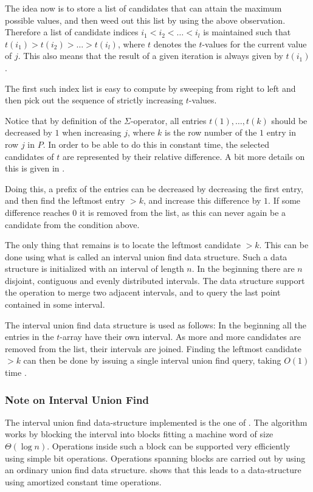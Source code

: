 \documentclass[twoside,11pt,openright]{report}
\begin{document}
The idea now is to store a list of candidates that can attain the maximum possible values, and then weed out this list by using the above observation. Therefore a list of candidate indices $i_1 < i_2 < \dots < i_l$ is maintained such that $t(i_1) > t(i_2) > \dots > t(i_l)$, where $t$ denotes the $t$-values for the current value of $j$. This also means that the result of a given iteration is always given by $t(i_1)$.

The first such index list is easy to compute by sweeping from right to left and then pick out the sequence of strictly increasing $t$-values.

Notice that by definition of the $\Sigma$-operator, all entries $t(1), \dots, t(k)$ should be decreased by $1$ when increasing $j$, where $k$ is the row number of the $1$ entry in row $j$ in $P$. In order to be able to do this in constant time, the selected candidates of $t$ are represented by their relative difference. A bit more details on this is given in \cite[Lemma 2, p. 234]{Gawrychowski:2012:FAC:2422024.2422048}.

Doing this, a prefix of the entries can be decreased by decreasing the first entry, and then find the leftmost entry $> k$, and increase this difference by $1$. If some difference reaches $0$ it is removed from the list, as this can never again be a candidate from the condition above.

The only thing that remains is to locate the leftmost candidate $> k$. This can be done using what is called an interval union find data structure. Such a data structure is initialized with an interval of length $n$. In the beginning there are $n$ disjoint, contiguous and evenly distributed intervals. The data structure support the operation to merge two adjacent intervals, and to query the last point contained in some interval.

The interval union find data structure is used as follows: In the beginning all the entries in the $t$-array have their own interval. As more and more candidates are removed from the list, their intervals are joined. Finding the leftmost candidate $> k$ can then be done by issuing a single interval union find query, taking $O(1)$ time \cite{Itai06lineartime}.

\subsubsection{Note on Interval Union Find}
\label{sec:algorithm:interval-union-find}
The interval union find data-structure implemented is the one of \cite{Itai06lineartime}. The algorithm works by blocking the interval into blocks fitting a machine word of size $\Theta(\log{n})$. Operations inside such a block can be supported very efficiently using simple bit operations. Operations spanning blocks are carried out by using an ordinary union find data structure. \cite{Itai06lineartime} shows that this leads to a data-structure using amortized constant time operations.
\end{document}
